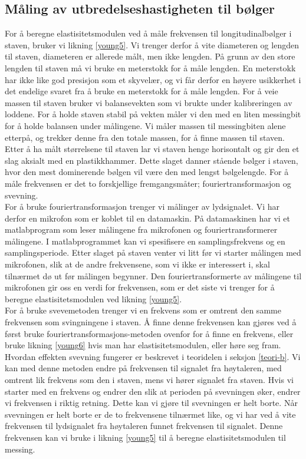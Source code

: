 \documentclass[%
 reprint,
 amsmath,amssymb,
 aps,
 norsk,
 booktabs
]{revtex4-1}
\begin{document}
\subsection{Måling av utbredelseshastigheten til bølger}
For å beregne elastisitetsmodulen ved å måle frekvensen til longitudinalbølger i staven, bruker vi likning \eqref{young5}. Vi trenger derfor å vite diameteren og lengden til staven, diameteren er allerede målt, men ikke lengden. På grunn av den store lengden til staven må vi bruke en meterstokk for å måle lengden. En meterstokk har ikke like god presisjon som et skyvelær, og vi får derfor en høyere usikkerhet i det endelige svaret fra å bruke en meterstokk for å måle lengden. For å veie massen til staven bruker vi balansevekten som vi brukte under kalibreringen av loddene. For å holde staven stabil på vekten måler vi den med en liten messingbit for å holde balansen under målingene. Vi måler massen til messingbiten alene etterpå, og trekker denne fra den totale massen, for å finne massen til staven. Etter å ha målt størrelsene til staven lar vi staven henge horisontalt og gir den et slag aksialt med en plastikkhammer. Dette slaget danner stående bølger i staven, hvor den mest dominerende bølgen vil være den med lengst bølgelengde. For å måle frekvensen er det to forskjellige fremgangsmåter; fouriertransformasjon og svevning.\\ For å bruke fouriertransformasjon trenger vi målinger av lydsignalet. Vi har derfor en mikrofon som er koblet til en datamaskin. På datamaskinen har vi et matlabprogram som leser målingene fra mikrofonen og fouriertransformerer målingene. I matlabprogrammet kan vi spesifisere en samplingsfrekvens og en samplingsperiode. Etter slaget på staven venter vi litt før vi starter målingen med mikrofonen, slik at de andre frekvensene, som vi ikke er interessert i, skal tilnærmet dø ut før målingen begynner. Den fouriertransformerte av målingene til mikrofonen gir oss en verdi for frekvensen, som er det siste vi trenger for å beregne elastisitetsmodulen ved likning \eqref{young5}.\\
For å bruke svevemetoden trenger vi en frekvens som er omtrent den samme frekvensen som svingningene i staven. Å finne denne frekvensen kan gjøres ved å først bruke fouriertransformasjons-metoden ovenfor for å finne en frekvens, eller bruke likning \eqref{young6} hvis man har elastisitetsmodulen, eller høre seg fram. Hvordan effekten svevning fungerer er beskrevet i teoridelen i seksjon \vref{teori-b}. Vi kan med denne metoden endre på frekvensen til signalet fra høytaleren, med omtrent lik frekvens som den i staven, mens vi hører signalet fra staven. Hvis vi starter med en frekvens og endrer den slik at perioden på svevningen øker, endrer vi frekvensen i riktig retning. Dette kan vi gjøre til svevningen er helt borte. Når svevningen er helt borte er de to frekvensene tilnærmet like, og vi har ved å vite frekvensen til lydsignalet fra høytaleren funnet frekvensen til signalet. Denne frekvensen kan vi bruke i likning \eqref{young5} til å beregne elastisitetsmodulen til messing.
\end{document}

